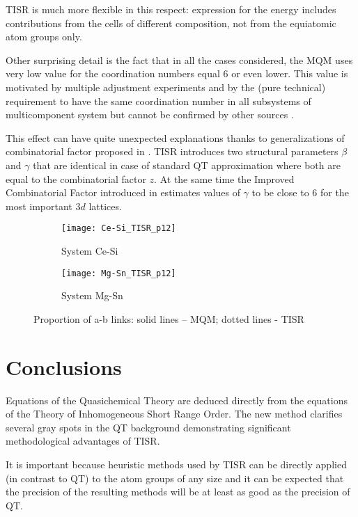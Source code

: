 \documentclass[12pt,abstract]{scrartcl}
\begin{document}
TISR is much more flexible in this respect: expression for the energy includes contributions from the cells of different composition, not from the equiatomic atom groups only.

Other surprising  detail is the fact that in all the cases considered, the MQM uses very low value for the coordination numbers equal 6 or even lower. This value is motivated \cite{Pelton_p1} by multiple adjustment experiments and  by the (pure technical) requirement to have the same coordination number in all subsystems of multicomponent system but cannot be confirmed by other sources \cite{brucepoling2000}.

This effect can have quite unexpected explanations thanks to generalizations of combinatorial factor proposed in \cite{TISR_p4}. TISR introduces two structural parameters $\beta$ and $\gamma$ that are identical in case of standard QT approximation where both are equal to the  combinatorial  factor $z$. At the same time the Improved Combinatorial Factor introduced in \cite{TISR_p4} estimates  values of $\gamma$  to be close to 6 for the most important $3d$ lattices.

\begin{figure}[h]
\centering
\begin{subfigure}{.5\textwidth}
  \centering
  \texttt{[image: Ce-Si\_TISR\_p12]}
  \caption{System Ce-Si}
  \label{fig:sub1}
\end{subfigure}%
\begin{subfigure}{.5\textwidth}
  \centering
  \texttt{[image: Mg-Sn\_TISR\_p12]}
  \caption{System Mg-Sn}
  \label{fig:sub2}
\end{subfigure}
\caption{Proportion of a-b links: solid lines -- MQM; dotted lines - TISR}
\label{fig:p12}
\end{figure}





\section{Conclusions}

Equations of the Quasichemical Theory are deduced directly from the equations of the Theory of Inhomogeneous Short Range Order. The new method clarifies several gray spots in the QT background demonstrating significant methodological advantages of TISR. 

It is important because heuristic methods used by TISR can be directly applied (in contrast to QT) to the atom groups of any size and it can be expected that the precision of the resulting methods will be at least as good as the precision of QT.
\end{document}
